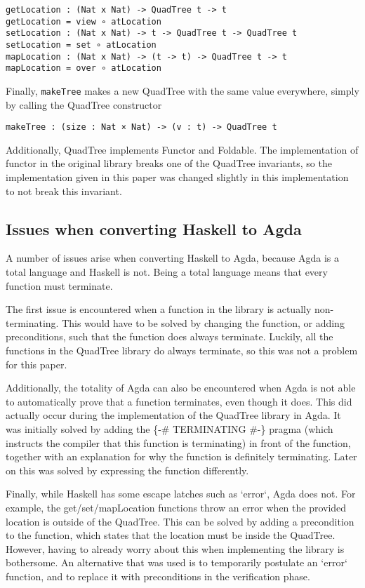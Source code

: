 \begin{verbatim}
getLocation : (Nat x Nat) -> QuadTree t -> t
getLocation = view ∘ atLocation
setLocation : (Nat x Nat) -> t -> QuadTree t -> QuadTree t
setLocation = set ∘ atLocation
mapLocation : (Nat x Nat) -> (t -> t) -> QuadTree t -> t
mapLocation = over ∘ atLocation
\end{verbatim}
Finally,  \verb|makeTree| makes a new QuadTree with the same value everywhere, simply by calling the QuadTree constructor
\begin{verbatim}
makeTree : (size : Nat × Nat) -> (v : t) -> QuadTree t
\end{verbatim}

Additionally, QuadTree implements Functor and Foldable. The implementation of functor in the original library breaks one of the QuadTree invariants, so the implementation given in this paper was changed slightly in this implementation to not break this invariant.

\subsection{Issues when converting Haskell to Agda}
A number of issues arise when converting Haskell to Agda, because Agda is a total language and Haskell is not. Being a total language means that every function must terminate. 

The first issue is encountered when a function in the library is actually non-terminating. This would have to be solved by changing the function, or adding preconditions, such that the function does always terminate. Luckily, all the functions in the QuadTree library do always terminate, so this was not a problem for this paper.

Additionally, the totality of Agda can also be encountered when Agda is not able to automatically prove that a function terminates, even though it does. This did actually occur during the implementation of the QuadTree library in Agda. It was initially solved by adding the \{-\# TERMINATING \#-\} pragma (which instructs the compiler that this function is terminating) in front of the function, together with an explanation for why the function is definitely terminating. Later on this was solved by expressing the function differently.

Finally, while Haskell has some escape latches such as `error`, Agda does not. For example, the get/set/mapLocation functions throw an error when the provided location is outside of the QuadTree. This can be solved by adding a precondition to the function, which states that the location must be inside the QuadTree. However, having to already worry about this when implementing the library is bothersome. An alternative that was used is to temporarily postulate an `error` function, and to replace it with preconditions in the verification phase.

